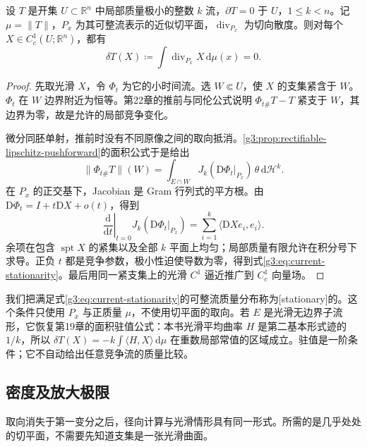 \begin{theorem}\label{g3:thm:minimizing-current-stationarity}
	设 \(T\) 是开集 \(U\subset\mathbb R^n\) 中局部质量极小的整数 \(k\) 流，\(\partial T=0\) 于 \(U\)，\(1\le k<n\)。记 \(\mu=\|T\|\)，\(P_x\) 为其可整流表示的近似切平面，\(\operatorname{div}_{P_x}\) 为切向散度。则对每个 \(X\in C_c^1(U;\mathbb R^n)\)，都有
	\begin{equation}\label{g3:eq:current-stationarity}
		\delta T(X)\coloneqq\int\operatorname{div}_{P_x}X\,\mathrm d\mu(x)=0.
	\end{equation}
\end{theorem}
\begin{proof}
	先取光滑 \(X\)，令 \(\Phi_t\) 为它的小时间流。选 \(W\Subset U\)，使 \(X\) 的支集紧含于 \(W\)。\(\Phi_t\) 在 \(W\) 边界附近为恒等。第22章的推前与同伦公式说明 \(\Phi_{t\#}T-T\) 紧支于 \(W\)，其边界为零，故是允许的局部竞争变化。

	微分同胚单射，推前时没有不同原像之间的取向抵消。\cref{g3:prop:rectifiable-lipschitz-pushforward}的面积公式于是给出
	\[
		\|\Phi_{t\#}T\|(W)
		=\int_{E\cap W}J_k(\mathrm D\Phi_t|_{P_x})\,\theta\,\mathrm d\mathcal H^k.
	\]
	在 \(P_x\) 的正交基下，Jacobian 是 Gram 行列式的平方根。由
	\(\mathrm D\Phi_t=I+t\mathrm DX+o(t)\)，得到
	\[
		\left.\frac{\mathrm d}{\mathrm dt}\right|_{t=0}
		J_k(\mathrm D\Phi_t|_{P_x})
		=\sum_{i=1}^k\langle\mathrm DXe_i,e_i\rangle.
	\]
	余项在包含 \(\operatorname{spt}X\) 的紧集以及全部 \(k\) 平面上均匀；局部质量有限允许在积分号下求导。正负 \(t\) 都是竞争参数，极小性迫使导数为零，得到式\eqref{g3:eq:current-stationarity}。最后用同一紧支集上的光滑 \(C^1\) 逼近推广到 \(C_c^1\) 向量场。
\end{proof}

我们把满足式\eqref{g3:eq:current-stationarity}的可整流质量分布称为[stationary]的。这个条件只使用 \(P_x\) 与正质量 \(\mu\)，不使用切平面的取向。若 \(E\) 是光滑无边界子流形，它恢复第19章的面积驻值公式：本书光滑平均曲率 \(H\) 是第二基本形式迹的 \(1/k\)，所以
\(\delta T(X)=-k\int\langle H,X\rangle\,\mathrm d\mu\)
在重数局部常值的区域成立。驻值是一阶条件；它不自动给出任意竞争流的质量比较。

\subsection{密度及放大极限}
\label{g3:subsec:2303:02}
取向消失于第一变分之后，径向计算与光滑情形具有同一形式。所需的是几乎处处的切平面，不需要先知道支集是一张光滑曲面。

